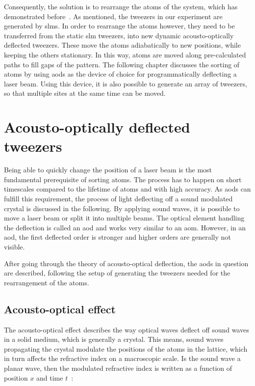 Consequently, the solution is to rearrange the atoms of the system, which has demonstrated before~\cite{Barredo2016, Endres2016, Barredo2018}. As mentioned, the tweezers in our experiment are generated by \acp{slm}. In order to rearrange the atoms however, they need to be transferred from the static \ac{slm} tweezers, into new dynamic acousto-optically deflected tweezers. These move the atoms adiabatically to new positions, while keeping the others stationary. In this way, atoms are moved along pre-calculated paths to fill gaps of the pattern. The following chapter discusses the sorting of atoms by using \acp{aod} as the device of choice for programmatically deflecting a laser beam. Using this device, it is also possible to generate an array of tweezers, so that multiple sites at the same time can be moved.


\section{Acousto-optically deflected tweezers}

Being able to quickly change the position of a laser beam is the most fundamental prerequisite of sorting atoms. The process has to happen on short timescales compared to the lifetime of atoms and with high accuracy. As \acp{aod} can fulfill this requirement, the process of light deflecting off a sound modulated crystal is discussed in the following. By applying sound waves, it is possible to move a laser beam or split it into multiple beams. The optical element handling the deflection is called an \ac{aod} and works very similar to an \ac{aom}. However, in an \ac{aod}, the first deflected order is stronger and higher orders are generally not visible.

After going through the theory of acousto-optical deflection, the \acp{aod} in question are described, following the setup of generating the tweezers needed for the rearrangement of the atoms.

\subsection{Acousto-optical effect}

The acousto-optical effect describes the way optical waves deflect off sound waves in a solid medium, which is generally a crystal. This means, sound waves propagating the crystal modulate the positions of the atoms in the lattice, which in turn affects the refractive index on a macroscopic scale. Is the sound wave a planar wave, then the modulated refractive index is written as a function of position $x$ and time $t$~\cite{Saleh1991}:

